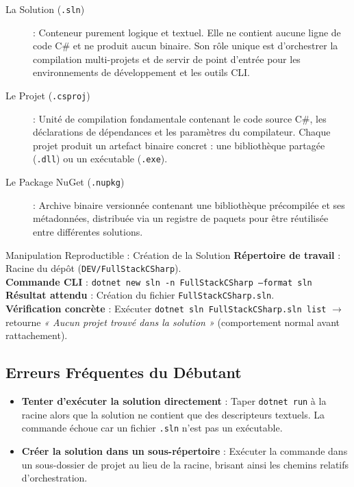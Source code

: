 \begin{description}
    \item[\color{secondary}La Solution (\texttt{.sln})] : Conteneur purement logique et textuel. Elle ne contient aucune ligne de code C\# et ne produit aucun binaire. Son rôle unique est d'orchestrer la compilation multi-projets et de servir de point d'entrée pour les environnements de développement et les outils CLI.
    \item[\color{cyanproj!90!black}Le Projet (\texttt{.csproj})] : Unité de compilation fondamentale contenant le code source C\#, les déclarations de dépendances et les paramètres du compilateur. Chaque projet produit un artefact binaire concret : une bibliothèque partagée (\texttt{.dll}) ou un exécutable (\texttt{.exe}).
    \item[\color{accent}Le Package NuGet (\texttt{.nupkg})] : Archive binaire versionnée contenant une bibliothèque précompilée et ses métadonnées, distribuée via un registre de paquets pour être réutilisée entre différentes solutions.
\end{description}

\vspace{0.2cm}

\begin{bestpracticebox}{Manipulation Reproductible : Création de la Solution}
\textbf{Répertoire de travail} : Racine du dépôt (\texttt{DEV/FullStackCSharp}).\\[2pt]
\textbf{Commande CLI} : \texttt{dotnet new sln -n FullStackCSharp --format sln}\\[2pt]
\textbf{Résultat attendu} : Création du fichier \texttt{FullStackCSharp.sln}.\\[2pt]
\textbf{Vérification concrète} : Exécuter \texttt{dotnet sln FullStackCSharp.sln list} $\longrightarrow$ retourne \textit{« Aucun projet trouvé dans la solution »} (comportement normal avant rattachement).
\end{bestpracticebox}

\vspace{0.2cm}

\subsection*{Erreurs Fréquentes du Débutant}

\begin{itemize}
    \item \textbf{Tenter d'exécuter la solution directement} : Taper \texttt{dotnet run} à la racine alors que la solution ne contient que des descripteurs textuels. La commande échoue car un fichier \texttt{.sln} n'est pas un exécutable.
    \item \textbf{Créer la solution dans un sous-répertoire} : Exécuter la commande dans un sous-dossier de projet au lieu de la racine, brisant ainsi les chemins relatifs d'orchestration.
\end{itemize}

